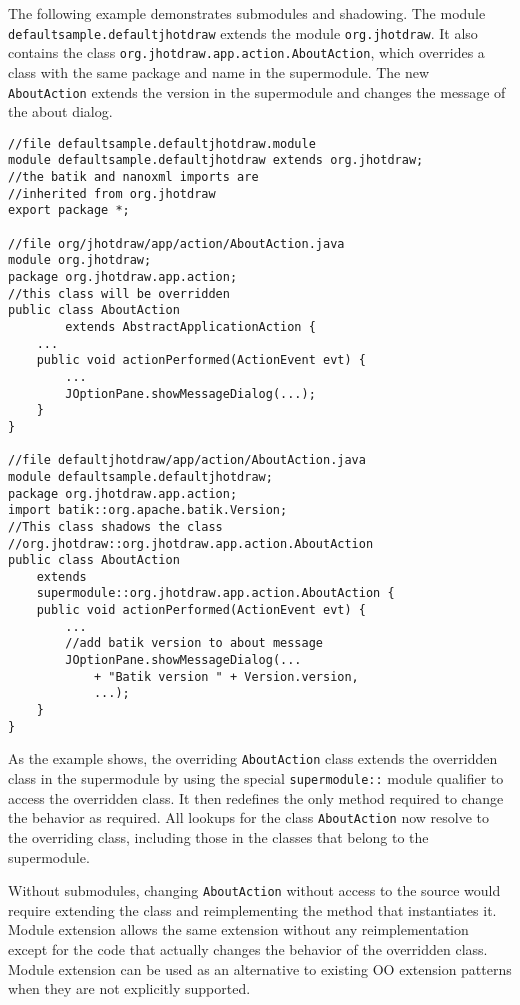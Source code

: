 The following example demonstrates submodules and shadowing. The module
\texttt{defaultsample.defaultjhotdraw} extends the module \texttt{org.jhotdraw}. 
It also contains the class \texttt{org.jhotdraw.app.action.AboutAction},
which overrides a class with the same package and name in the supermodule.
The new \texttt{AboutAction} extends the version in the supermodule and
changes the message of the about dialog.

\begin{lstlisting}[caption=Module Subtyping]
//file defaultsample.defaultjhotdraw.module 
module defaultsample.defaultjhotdraw extends org.jhotdraw;
//the batik and nanoxml imports are 
//inherited from org.jhotdraw
export package *;

//file org/jhotdraw/app/action/AboutAction.java
module org.jhotdraw;
package org.jhotdraw.app.action;
//this class will be overridden
public class AboutAction 
		extends AbstractApplicationAction {
	...
	public void actionPerformed(ActionEvent evt) {
		...
		JOptionPane.showMessageDialog(...);
	}
}

//file defaultjhotdraw/app/action/AboutAction.java
module defaultsample.defaultjhotdraw;
package org.jhotdraw.app.action;
import batik::org.apache.batik.Version;
//This class shadows the class
//org.jhotdraw::org.jhotdraw.app.action.AboutAction
public class AboutAction 
	extends 
	supermodule::org.jhotdraw.app.action.AboutAction {
	public void actionPerformed(ActionEvent evt) {
		...
		//add batik version to about message
		JOptionPane.showMessageDialog(...
			+ "Batik version " + Version.version,
			...);
	}
}

\end{lstlisting}

As the example shows, the overriding \texttt{AboutAction} class extends the
overridden class in the supermodule by using the special 
\texttt{supermodule::} module qualifier to access the overridden class. It
then redefines the only method required to change the behavior as required.
All lookups for the class \texttt{AboutAction} now resolve to the overriding
class, including those in the classes that belong to the supermodule.

Without submodules, changing \texttt{AboutAction} without access to the source
would require extending the class and reimplementing the method 
that instantiates it. Module extension allows the same extension without
any reimplementation except for the code that actually changes the behavior of the overridden class.
Module extension can be used as an alternative to existing OO extension patterns when they
are not explicitly supported. 

